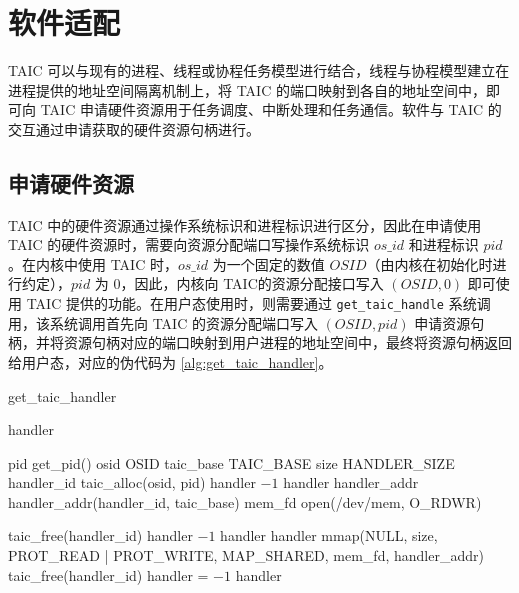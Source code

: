 \section{软件适配}

TAIC 可以与现有的进程、线程或协程任务模型进行结合，线程与协程模型建立在进程提供的地址空间隔离机制上，将 TAIC 的端口映射到各自的地址空间中，即可向 TAIC 申请硬件资源用于任务调度、中断处理和任务通信。软件与 TAIC 的交互通过申请获取的硬件资源句柄进行。

\subsection{申请硬件资源}

TAIC 中的硬件资源通过操作系统标识和进程标识进行区分，因此在申请使用 TAIC 的硬件资源时，需要向资源分配端口写操作系统标识 $os\_id$ 和进程标识 $pid$。在内核中使用 TAIC 时，$os\_id$ 为一个固定的数值 $OSID$（由内核在初始化时进行约定），$pid$ 为 0，因此，内核向 TAIC的资源分配接口写入 $(OSID, 0)$ 即可使用 TAIC 提供的功能。在用户态使用时，则需要通过 \verb|get_taic_handle| 系统调用，该系统调用首先向 TAIC 的资源分配端口写入 $(OSID, pid)$ 申请资源句柄，并将资源句柄对应的端口映射到用户进程的地址空间中，最终将资源句柄返回给用户态，对应的伪代码为 \ref{alg:get_taic_handler}。

\begin{algorithm}
  \caption{get\_taic\_handler}
  \label{alg:get_taic_handler}
  \begin{algorithmic}[1]
    \Require
    \Ensure handler
    
    \State  pid \gets get\_pid()
    \State  osid \gets OSID
    \State  taic\_base \gets TAIC\_BASE
    \State  size \gets HANDLER\_SIZE
    \State  handler\_id \gets taic\_alloc(osid, pid) {}
        \State  handler \gets $-1$
        \Return handler
    \EndIf
    \State handler\_addr \gets handler\_addr(handler\_id, 
    \Statex \qquad \qquad \qquad \qquad \qquad \qquad taic\_base) {}
    \State mem\_fd \gets open(\textquotedbl/dev/mem\textquotedbl, O\_RDWR)

        \State taic\_free(handler\_id)
        \State handler \gets $-1$
        \Return handler
    \EndIf
    \State handler \gets mmap(NULL, size, 
    \Statex \qquad \qquad \qquad \qquad PROT\_READ | PROT\_WRITE, 
    \Statex \qquad \qquad \qquad \qquad MAP\_SHARED, 
    \Statex \qquad \qquad \qquad \qquad mem\_fd, handler\_addr) {}
        \State taic\_free(handler\_id)
        \State  handler = $-1$
    \EndIf
    \Return handler
  \end{algorithmic}
\end{algorithm}

